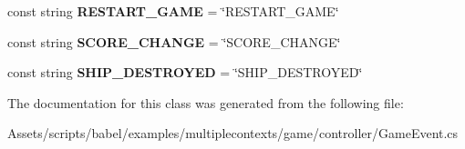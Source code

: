 \begin{DoxyCompactItemize}
\item 
\hypertarget{classbabel_1_1examples_1_1multiplecontexts_1_1game_1_1_game_event_a8c93ce3329746418d4e81770274f03d9}{const string {\bfseries R\-E\-S\-T\-A\-R\-T\-\_\-\-G\-A\-M\-E} = \char`\"{}R\-E\-S\-T\-A\-R\-T\-\_\-\-G\-A\-M\-E\char`\"{}}\label{classbabel_1_1examples_1_1multiplecontexts_1_1game_1_1_game_event_a8c93ce3329746418d4e81770274f03d9}

\item 
\hypertarget{classbabel_1_1examples_1_1multiplecontexts_1_1game_1_1_game_event_a13d8e45a7e0ec28ed4b5f414c3c5dad7}{const string {\bfseries S\-C\-O\-R\-E\-\_\-\-C\-H\-A\-N\-G\-E} = \char`\"{}S\-C\-O\-R\-E\-\_\-\-C\-H\-A\-N\-G\-E\char`\"{}}\label{classbabel_1_1examples_1_1multiplecontexts_1_1game_1_1_game_event_a13d8e45a7e0ec28ed4b5f414c3c5dad7}

\item 
\hypertarget{classbabel_1_1examples_1_1multiplecontexts_1_1game_1_1_game_event_af2436dd0a75d181307d6f58be278619c}{const string {\bfseries S\-H\-I\-P\-\_\-\-D\-E\-S\-T\-R\-O\-Y\-E\-D} = \char`\"{}S\-H\-I\-P\-\_\-\-D\-E\-S\-T\-R\-O\-Y\-E\-D\char`\"{}}\label{classbabel_1_1examples_1_1multiplecontexts_1_1game_1_1_game_event_af2436dd0a75d181307d6f58be278619c}

\end{DoxyCompactItemize}


The documentation for this class was generated from the following file\-:\begin{DoxyCompactItemize}
\item 
Assets/scripts/babel/examples/multiplecontexts/game/controller/Game\-Event.\-cs\end{DoxyCompactItemize}
